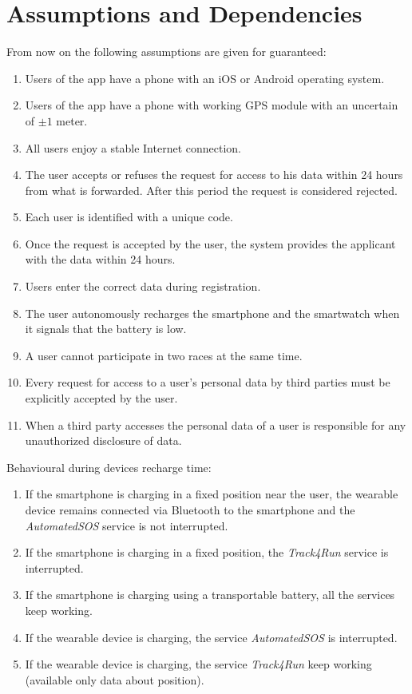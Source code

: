 \section{Assumptions and Dependencies}
From now on the following assumptions are given for guaranteed:
\begin{enumerate}
  \item Users of the app have a phone with an iOS or Android operating system.
  \item Users of the app have a phone with working GPS module with an uncertain of \begin{math} \pm1 \end{math} meter.
  \item All users enjoy a stable Internet connection.
  \item The user accepts or refuses the request for access to his data within 24 hours from what is forwarded. After this period the request is considered rejected.
  \item Each user is identified with a unique code.
  \item Once the request is accepted by the user, the system provides the applicant with the data within 24 hours.
  \item Users enter the correct data during registration.
  \item The user autonomously recharges the smartphone and the smartwatch when it signals that the battery is low.
  \item A user cannot participate in two races at the same time.
  \item Every request for access to a user's personal data by third parties must be explicitly accepted by the user.
  \item When a third party accesses the personal data of a user is responsible for any unauthorized disclosure of data.
\end{enumerate}

\vspace{1cm}

Behavioural during devices recharge time:
\begin{enumerate}
  \item If the smartphone is charging in a fixed position near the user, the wearable device remains connected via Bluetooth to the smartphone and the \textit{AutomatedSOS} service is not interrupted.
  \item If the smartphone is charging in a fixed position, the \textit{Track4Run} service is interrupted.
  \item If the smartphone is charging using a transportable battery, all the services keep working.
  \item If the wearable device is charging, the service \textit{AutomatedSOS} is interrupted.
  \item If the wearable device is charging, the service \textit{Track4Run} keep working (available only data about position).
\end{enumerate}

